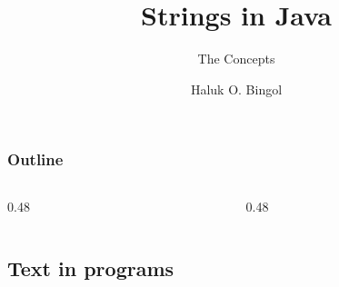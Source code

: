 \documentclass[aspectratio=169,10pt,compress]{beamer}
\title{Strings in Java}
\subtitle{The Concepts}
\author[Bingol]{Haluk O. Bingol}
\institute[FCIS]{
    Faculty of Computer and Information Sciences\\
    Yeditepe University
}
\date{
	{\tiny \hbTimeStamp}
}
\begin{document}
\begin{frame}[t,fragile]
  \titlepage
\end{frame}




\begin{frame}[t,fragile] \frametitle{Outline}
  \begin{columns}[T]
    \begin{column}{0.48\textwidth}
      \tableofcontents[sections={1-8}, hideallsubsections]
    \end{column}
    \begin{column}{0.48\textwidth}
      \tableofcontents[sections={9-16}, hideallsubsections]
    \end{column}
  \end{columns}
\end{frame}


\subsection[Text]{Text in programs}
\end{document}
